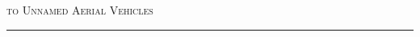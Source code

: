 \documentclass[preview]{standalone}
\begin{document}
\begin{center}
\scshape\Large to Unnamed Aerial Vehicles \\ \hrule
\end{center}
\end{document}
